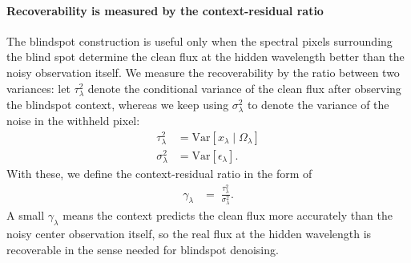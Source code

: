 \documentclass[twocolumn]{aastex7}
\newcommand{\ld}[1]{\textcolor{red}{\textbf{#1}}}
\begin{document}
\paragraph{Recoverability is measured by the context-residual ratio}
The blindspot construction is useful only when the spectral pixels surrounding the blind spot determine the clean flux at the hidden wavelength better than the noisy observation itself. We measure the recoverability by the ratio between two variances: let $\tau_\lambda^{2}$ denote the conditional variance of the clean flux after observing the blindspot context, whereas we keep using $\sigma_\lambda^{2}$ to denote the variance of the noise in the withheld pixel:
\begin{align}
    \tau_\lambda^{2} &= \mathrm{Var}[x_{\lambda}\mid\Omega_{\lambda}] \\[1em]
    \sigma_\lambda^{2} &= \mathrm{Var}[\epsilon_{\lambda}].
\end{align}
With these, we define the context-residual ratio in the form of
\begin{align}
    \gamma_\lambda &=\; \frac{\tau_\lambda^{2}}{\sigma_\lambda^{2}}.
    \label{eq:gamma}
\end{align}
A small $\gamma_\lambda$ means the context predicts the clean flux more accurately than the noisy center observation itself, so the real flux at the hidden wavelength is recoverable in the sense needed for blindspot denoising.


\end{document}
